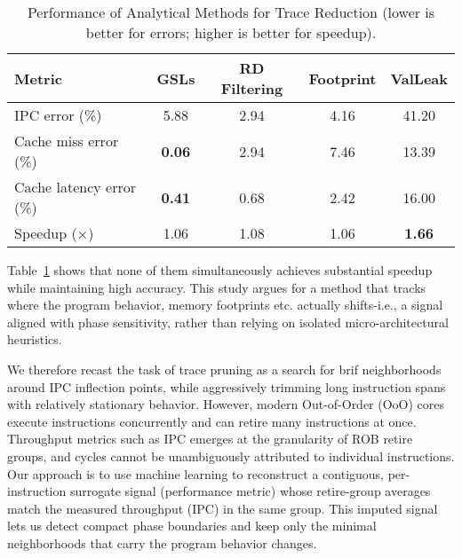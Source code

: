 \begin{table}[htbp!]
\caption{Performance of Analytical Methods for Trace Reduction (lower is better for errors; higher is better for speedup).}
\label{tab:comparison_methods}
\centering
\setlength{\tabcolsep}{4pt}
\begin{adjustbox}{max width=1.09\columnwidth}
\begin{tabular}{l|cccc}
\toprule
Metric & GSLs & RD Filtering & Footprint & ValLeak \\
\midrule
IPC error (\%)             & 5.88 & {2.94} & 4.16 & 41.20 \\
Cache miss error (\%)      & \textbf{0.06} & 2.94 & 7.46 & 13.39 \\
Cache latency error (\%)   & \textbf{0.41} & 0.68 & 2.42 & 16.00 \\
Speedup ($\times$)         & 1.06 & 1.08 & 1.06 & \textbf{1.66} \\
\bottomrule
\end{tabular}
\end{adjustbox}
\end{table}


Table~\ref{tab:comparison_methods} shows that none of them simultaneously achieves substantial speedup while maintaining high accuracy. This study argues for a method that tracks where the program behavior, memory footprints etc. actually shifts-i.e., a signal aligned with phase sensitivity, rather than relying on isolated micro-architectural heuristics.


We therefore recast the task of trace pruning as a search for brif neighborhoods around IPC inflection points, while aggressively trimming long instruction spans with relatively stationary behavior. However, modern Out-of-Order (OoO) cores execute instructions concurrently and can retire many instructions at once. Throughput metrics such as IPC emerges at the granularity of ROB retire groups, and cycles cannot be unambiguously attributed to individual instructions. Our approach is to use machine learning to reconstruct a contiguous, per-instruction surrogate signal (performance metric) whose retire-group averages match the measured throughput (IPC) in the same group. This imputed signal lets us detect compact phase boundaries and keep only the minimal neighborhoods that carry the program behavior changes. 


